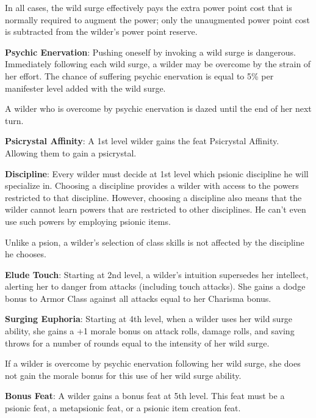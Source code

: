 In all cases, the wild surge effectively pays the extra power point cost that is normally required to augment the power; only the unaugmented power point cost is subtracted from the wilder’s power point reserve.

\textbf{Psychic Enervation}: Pushing oneself by invoking a wild surge is dangerous. Immediately following each wild surge, a wilder may be overcome by the strain of her effort. The chance of suffering psychic enervation is equal to 5\% per manifester level added with the wild surge.

A wilder who is overcome by psychic enervation is dazed until the end of her next turn.

\textbf{Psicrystal Affinity}: A 1st level wilder gains the feat Psicrystal Affinity. Allowing them to gain a psicrystal.

\textbf{Discipline}: Every wilder must decide at 1st level which psionic discipline he will specialize in. Choosing a discipline provides a wilder with access to the powers restricted to that discipline. However, choosing a discipline also means that the wilder cannot learn powers that are restricted to other disciplines. He can’t even use such powers by employing psionic items.

Unlike a psion, a wilder's selection of class skills is not affected by the discipline he chooses.

\textbf{Elude Touch}: Starting at 2nd level, a wilder’s intuition supersedes her intellect, alerting her to danger from attacks (including touch attacks). She gains a dodge bonus to Armor Class against all attacks equal to her Charisma bonus.

\textbf{Surging Euphoria}: Starting at 4th level, when a wilder uses her wild surge ability, she gains a +1 morale bonus on attack rolls, damage rolls, and saving throws for a number of rounds equal to the intensity of her wild surge.

If a wilder is overcome by psychic enervation following her wild surge, she does not gain the morale bonus for this use of her wild surge ability.

\textbf{Bonus Feat}: A wilder gains a bonus feat at 5th level. This feat must be a psionic feat, a metapsionic feat, or a psionic item creation feat.